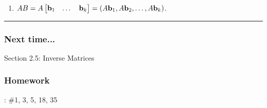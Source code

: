 \begin{enumerate}
\rule[0.01in]{\textwidth}{0.0025in}


\item $A B = A \begin{bmatrix} {\bf b}_1 & \dots & {\bf b}_k \end{bmatrix} = (A{\bf b}_1, A{\bf b}_2, \dots, A {\bf b}_k)$.






\end{enumerate}
 
 
 

\rule[0.01in]{\textwidth}{0.0025in}






































\subsubsection*{Next time...}
Section 2.5: Inverse Matrices





\subsubsection*{Homework}
: \#1, 3, 5, 18, 35












